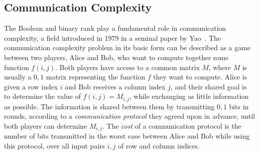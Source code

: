 \documentclass[11pt]{article}
\begin{document}
\subsection{Communication Complexity}
\label{subsec-communication}
The Boolean and binary rank play a fundamental role in communication complexity, a field introduced in 1979 in a seminal paper by Yao~\cite{Yao79}.
The communication complexity problem in its basic form can be described as a game between two players, Alice and Bob,
who want to compute together some function $f(i,j)$.
Both players have access to a common matrix $M$, where $M$ is usually a $0,1$ matrix representing the function $f$ they want to compute.
Alice is given a row index $i$ and Bob receives a column index $j$, and their shared goal is to determine the value of $f(i,j) = M_{i,j}$,
while exchanging as little information as possible.
The information is shared between them by transmitting $0,1$ bits in rounds, according to a {\em communication protocol} they agreed upon in advance, until both players can determine $M_{i,j}$.
The {\em cost} of a communication protocol is the number of bits transmitted in the worst case between Alice and Bob while using this protocol,
over all input pairs $i,j$ of row and column indices.
\end{document}
